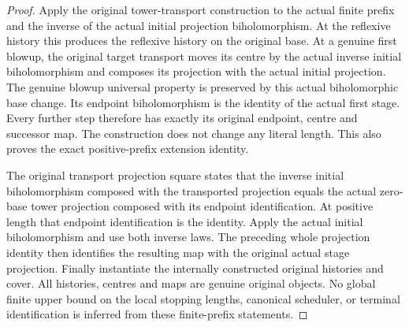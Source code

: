 \begin{proof}
Apply the original tower-transport construction to the actual finite
prefix and the inverse of the actual initial projection biholomorphism.
At the reflexive history this produces the reflexive history on the
original base. At a genuine first blowup, the original target transport
moves its centre by the actual inverse initial biholomorphism and composes
its projection with the actual initial projection. The genuine blowup
universal property is preserved by this actual biholomorphic base change.
Its endpoint biholomorphism is the identity of the actual first stage.
Every further step therefore has exactly its original endpoint, centre
and successor map. The construction does not change any literal length.
This also proves the exact positive-prefix extension identity.

The original transport projection square states that the inverse initial
biholomorphism composed with the transported projection equals the actual
zero-base tower projection composed with its endpoint identification.
At positive length that endpoint identification is the identity. Apply
the actual initial biholomorphism and use both inverse laws. The preceding
whole projection identity then identifies the resulting map with the
original actual stage projection. Finally instantiate the internally
constructed original histories and cover. All histories, centres and
maps are genuine original objects. No global finite upper bound on the
local stopping lengths, canonical scheduler, or terminal identification
is inferred from these finite-prefix statements.
\end{proof}
